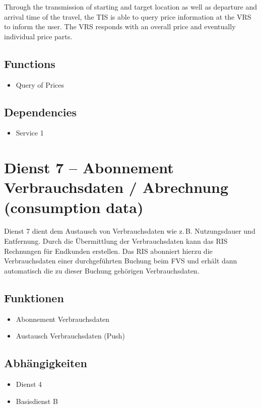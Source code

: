 Through the transmission of starting and target location as well as departure and arrival time of the travel, the TIS is able to query price information at the VRS to inform the user. The VRS responds with an overall price and eventually individual price parts.

\subsection*{Functions}
\begin{itemize}
\item Query of Prices
\end{itemize}

\subsection*{Dependencies}
\begin{itemize}
\item Service 1
\end{itemize}


\section{Dienst 7 -- Abonnement Verbrauchsdaten / Abrechnung (consumption data)}
Dienst 7 dient dem Austausch von Verbrauchsdaten wie z.\,B. Nutzungsdauer und Entfernung. Durch die Übermittlung der Verbrauchsdaten kann das RIS Rechnungen für Endkunden erstellen. Das RIS abonniert hierzu die Verbrauchsdaten einer durchgeführten Buchung beim FVS und erhält dann automatisch die zu dieser Buchung gehörigen Verbrauchsdaten.

\subsection*{Funktionen}
\begin{itemize}
\item Abonnement Verbrauchsdaten
\item Austausch Verbrauchsdaten (Push)
\end{itemize}

\subsection*{Abhängigkeiten}
\begin{itemize}
\item Dienst 4
\item Basisdienst B
\end{itemize}

